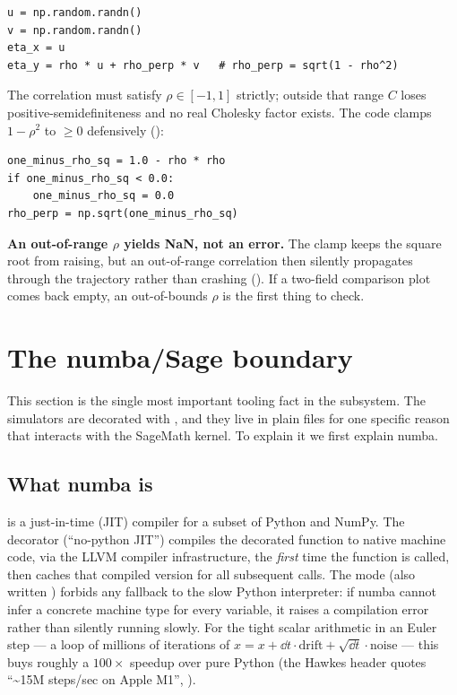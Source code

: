 \begin{lstlisting}
u = np.random.randn()
v = np.random.randn()
eta_x = u
eta_y = rho * u + rho_perp * v   # rho_perp = sqrt(1 - rho^2)
\end{lstlisting}

The correlation must satisfy $\rho \in [-1, 1]$ strictly; outside that range $C$
loses positive-semidefiniteness and no real Cholesky factor exists. The code
clamps $1-\rho^{2}$ to $\ge 0$ defensively
():

\begin{lstlisting}
one_minus_rho_sq = 1.0 - rho * rho
if one_minus_rho_sq < 0.0:
    one_minus_rho_sq = 0.0
rho_perp = np.sqrt(one_minus_rho_sq)
\end{lstlisting}

\begin{gotcha}
\textbf{An out-of-range $\rho$ yields NaN, not an error.} The clamp keeps the
square root from raising, but an out-of-range correlation then silently propagates
 through the trajectory rather than crashing
(). If a two-field comparison plot comes
back empty, an out-of-bounds $\rho$ is the first thing to check.
\end{gotcha}

\section{The numba/Sage boundary}
\label{sec:numbasage}

This section is the single most important tooling fact in the subsystem. The
simulators are decorated with , and they live in plain 
files for one specific reason that interacts with the SageMath kernel. To explain
it we first explain numba.

\subsection{What numba is}

 is a just-in-time (JIT) compiler for a subset of Python and NumPy. The
decorator  (``no-python JIT'') compiles the decorated function to
native machine code, via the LLVM compiler infrastructure, the \emph{first} time
the function is called, then caches that compiled version for all subsequent
calls. The  mode (also written ) forbids any
fallback to the slow Python interpreter: if numba cannot infer a concrete machine
type for every variable, it raises a compilation error rather than silently
running slowly. For the tight scalar arithmetic in an Euler step --- a loop of
millions of iterations of $x = x + \dd t\cdot\text{drift} + \sqrt{\dd t}\cdot
\text{noise}$ --- this buys roughly a $100\times$ speedup over pure Python (the
Hawkes header quotes ``\textasciitilde 15M steps/sec on Apple M1'',
).

